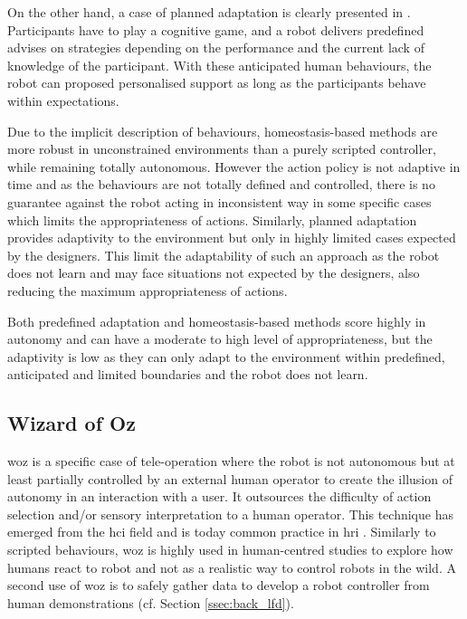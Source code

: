 	On the other hand, a case of planned adaptation is clearly presented in \citet{leyzberg2014personalizing}. Participants have to play a cognitive game,  and a robot delivers predefined advises on strategies depending on the performance and the current lack of knowledge of the participant. With these anticipated human behaviours, the robot can proposed personalised support as long as the participants behave within expectations. 

	
	Due to the implicit description of behaviours, homeostasis-based methods are more robust in unconstrained environments than a purely scripted controller, while remaining totally autonomous. However the action policy is not adaptive in time and as the behaviours are not totally defined and controlled, there is no guarantee against the robot acting in inconsistent way in some specific cases which limits the appropriateness of actions. Similarly, planned adaptation provides adaptivity to the environment but only in highly limited cases expected by the designers. This limit the adaptability of such an approach as the robot does not learn and may face situations not expected by the designers, also reducing the maximum appropriateness of actions.

	
	Both predefined adaptation and homeostasis-based methods score highly in autonomy and can have a moderate to high level of appropriateness, but the adaptivity is low as they can only adapt to the environment within predefined, anticipated and limited boundaries and the robot does not learn.

\subsection{Wizard of Oz} \label{subsec:WoZ}

	\acrfull{woz} is a specific case of tele-operation where the robot is not autonomous but at least partially controlled by an external human operator to create the illusion of autonomy in an interaction with a user. It outsources the difficulty of action selection and/or sensory interpretation to a human operator. This technique has emerged from the \gls{hci} field \citep{kelley1983empirical} and is today common practice in \gls{hri} \citep{riek2012wizard}. Similarly to scripted behaviours, \gls{woz} is highly used in human-centred studies to explore how humans react to robot and not as a realistic way to control robots in the wild. A second use of \gls{woz} is to safely gather data to develop a robot controller from human demonstrations (cf. Section \ref{ssec:back_lfd}).
	
